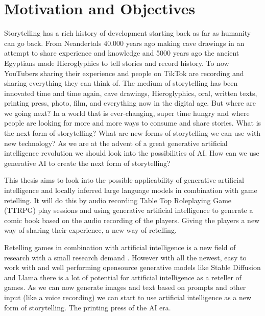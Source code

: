 \section{Motivation and Objectives}

Storytelling has a rich history of development starting back as far as humanity can go back. From Neandertals 40.000 years ago making cave drawings in an attempt to share experience and knowledge and 5000 years ago the ancient Egyptians made Hieroglyphics to tell stories and record history. To now YouTubers sharing their experience and people on TikTok are recording and sharing everything they can think of. The medium of storytelling has been innovated time and time again, cave drawings, Hieroglyphics, oral, written texts, printing press, photo, film, and everything now in the digital age. But where are we going next? In a world that is ever-changing, super time hungry and where people are looking for more and more ways to consume and share stories. What is the next form of storytelling? What are new forms of storytelling we can use with new technology? As we are at the advent of a great generative artificial intelligence revolution we should look into the possibilities of AI. How can we use generative AI to create the next form of storytelling?

This thesis aims to look into the possible applicability of generative artificial intelligence and locally inferred large language models in combination with game retelling. It will do this by audio recording Table Top Roleplaying Game (TTRPG) play sessions and using generative artificial intelligence to generate a comic book based on the audio recording of the players. Giving the players a new way of sharing their experience, a new way of retelling.

Retelling games in combination with artificial intelligence is a new field of research with a small research demand \cite{Gallotta2024LLM}. However with all the newest, easy to work with and well performing opensource generative models like Stable Diffusion \cite{rombach2021highresolution} and Llama \cite{touvron2023llamaopenefficientfoundation} there is a lot of potential for artificial intelligence as a reteller of games. As we can now generate images and text based on prompts and other input (like a voice recording) we can start to use artificial intelligence as a new form of storytelling. The printing press of the AI era.

